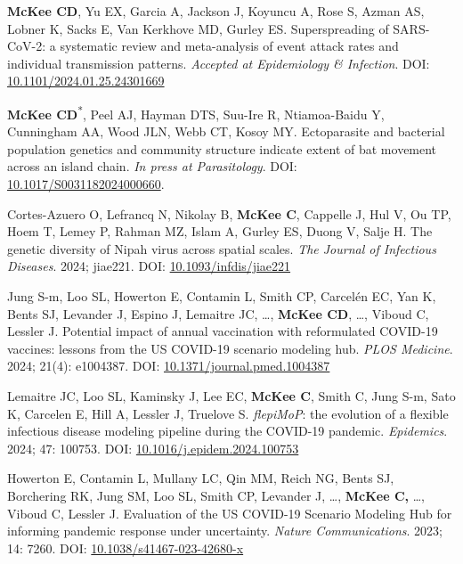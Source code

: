 \documentclass{cv}
\begin{document}
\begin{pubenum}

\item \textbf{McKee CD}, Yu EX, Garcia A, Jackson J, Koyuncu A, Rose S, Azman AS, Lobner K, Sacks E, Van Kerkhove MD, Gurley ES. Superspreading of SARS-CoV-2: a systematic review and meta-analysis of event attack rates and individual transmission patterns. \textit{Accepted at Epidemiology \& Infection}. DOI: \href{https://doi.org/10.1101/2024.01.25.24301669}{10.1101/2024.01.25.24301669}

\item \textbf{McKee CD}\textsuperscript{*}, Peel AJ, Hayman DTS, Suu-Ire R, Ntiamoa-Baidu Y, Cunningham AA, Wood JLN, Webb CT, Kosoy MY. Ectoparasite and bacterial population genetics and community structure indicate extent of bat movement across an island chain. \textit{In press at Parasitology}. DOI: \href{https://doi.org/10.1017/S0031182024000660}{10.1017/S0031182024000660}.

\item Cortes-Azuero O, Lefrancq N, Nikolay B, \textbf{McKee C}, Cappelle J, Hul V, Ou TP, Hoem T, Lemey P, Rahman MZ, Islam A, Gurley ES, Duong V, Salje H. The genetic diversity of Nipah virus across spatial scales. \textit{The Journal of Infectious Diseases}. 2024; jiae221. DOI: \href{https://doi.org/10.1093/infdis/jiae221}{10.1093/infdis/jiae221}

\item Jung S-m, Loo SL, Howerton E, Contamin L, Smith CP, Carcelén EC, Yan K, Bents SJ, Levander J, Espino J, Lemaitre JC, …, \textbf{McKee CD}, …, Viboud C, Lessler J. Potential impact of annual vaccination with reformulated COVID-19 vaccines: lessons from the US COVID-19 scenario modeling hub. \textit{PLOS Medicine}. 2024; 21(4): e1004387. DOI: \href{https://doi.org/10.1371/journal.pmed.1004387}{10.1371/journal.pmed.1004387}

\item Lemaitre JC, Loo SL, Kaminsky J, Lee EC, \textbf{McKee C}, Smith C, Jung S-m, Sato K, Carcelen E, Hill A, Lessler J, Truelove S. \textit{flepiMoP}: the evolution of a flexible infectious disease modeling pipeline during the COVID-19 pandemic. \textit{Epidemics}. 2024; 47: 100753. DOI: \href{https://doi.org/10.1016/j.epidem.2024.100753}{10.1016/j.epidem.2024.100753}

\item Howerton E, Contamin L, Mullany LC, Qin MM, Reich NG, Bents SJ, Borchering RK, Jung SM, Loo SL, Smith CP, Levander J, …, \textbf{McKee C,} …, Viboud C, Lessler J. Evaluation of the US COVID-19 Scenario Modeling Hub for informing pandemic response under uncertainty. \textit{Nature Communications}. 2023; 14: 7260. DOI: \href{https://doi.org/10.1038/s41467-023-42680-x}{10.1038/s41467-023-42680-x}


\end{pubenum}
\end{document}
